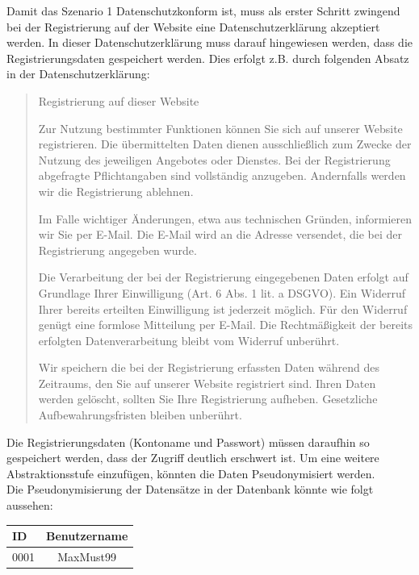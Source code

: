 \documentclass[a4paper, 12pt]{article}
\begin{document}
\noindent Damit das Szenario 1 Datenschutzkonform ist, muss als erster Schritt zwingend bei der Registrierung auf der Website eine Datenschutzerklärung akzeptiert werden.
In dieser Datenschutzerklärung muss darauf hingewiesen werden, dass die Registrierungsdaten gespeichert werden. Dies erfolgt z.B. durch folgenden Absatz in der Datenschutzerklärung: 
\newpage
\begin{quote}
	Registrierung auf dieser Website
	
	Zur Nutzung bestimmter Funktionen können Sie sich auf unserer Website registrieren. Die übermittelten Daten dienen ausschließlich zum Zwecke der Nutzung des jeweiligen Angebotes oder Dienstes. Bei der Registrierung abgefragte Pflichtangaben sind vollständig anzugeben. Andernfalls werden wir die Registrierung ablehnen.
	
	Im Falle wichtiger Änderungen, etwa aus technischen Gründen, informieren wir Sie per E-Mail. Die E-Mail wird an die Adresse versendet, die bei der Registrierung angegeben wurde.
	
	Die Verarbeitung der bei der Registrierung eingegebenen Daten erfolgt auf Grundlage Ihrer Einwilligung (Art. 6 Abs. 1 lit. a DSGVO). Ein Widerruf Ihrer bereits erteilten Einwilligung ist jederzeit möglich. Für den Widerruf genügt eine formlose Mitteilung per E-Mail. Die Rechtmäßigkeit der bereits erfolgten Datenverarbeitung bleibt vom Widerruf unberührt.
	
	Wir speichern die bei der Registrierung erfassten Daten während des Zeitraums, den Sie auf unserer Website registriert sind. Ihren Daten werden gelöscht, sollten Sie Ihre Registrierung aufheben. Gesetzliche Aufbewahrungsfristen bleiben unberührt.
\end{quote}

\noindent Die Registrierungsdaten (Kontoname und Passwort) müssen daraufhin so gespeichert werden, dass der Zugriff deutlich erschwert ist. Um eine weitere Abstraktionsstufe einzufügen, könnten die Daten Pseudonymisiert werden. \\

\noindent Die Pseudonymisierung der Datensätze in der Datenbank könnte wie folgt aussehen:\\

\begin{tabular}{lc}
	
	ID & Benutzername \\
	\hline
	0001 & MaxMust99
	
\end{tabular}\\\\
\end{document}
